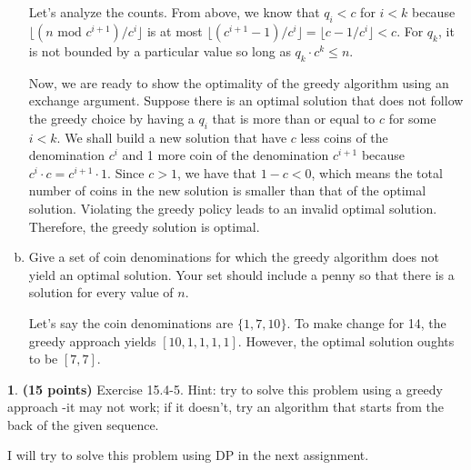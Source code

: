 \documentclass[11pt]{article}
\theoremstyle{definition}
\theoremstyle{theorem}
\newtheorem{prob}{}
\newcommand{\solution}{\medskip\noindent{\color{DarkBlue}\textbf{Solution:}}}
\begin{document}
\begin{enumerate}[(a)]
Let's analyze the counts. From above, we know that $q_i < c$ for $i < k$ because $\lfloor (n \text{ mod } c^{i+1})/c^i \rfloor$ is at most $\lfloor (c^{i+1} - 1)/c^i \rfloor = \lfloor c - 1/c^i \rfloor < c$. For $q_k$, it is not bounded by a particular value so long as $q_k \cdot c^k \le n$. 

Now, we are ready to show the optimality of the greedy algorithm using an exchange argument. Suppose there is an optimal solution that does not follow the greedy choice by having a $q_i$ that is more than or equal to $c$ for some $i < k$. We shall build a new solution that have $c$ less coins of the denomination $c^i$ and 1 more coin of the denomination $c^{i+1}$ because $c^i \cdot c = c^{i+1} \cdot 1$. Since $c > 1$, we have that $1 - c < 0$, which means the total number of coins in the new solution is smaller than that of the optimal solution. Violating the greedy policy leads to an invalid optimal solution. Therefore, the greedy solution is optimal.

\item Give a set of coin denominations for which the greedy algorithm does not yield an optimal solution. Your set should include a penny so that there is a solution for every value of $n$.

\solution

Let's say the coin denominations are $\{1, 7, 10\}$. To make change for 14, the greedy approach yields $[10, 1, 1, 1, 1]$. However, the optimal solution oughts to be $[7, 7]$.
\end{enumerate}


\newpage
\begin{prob} \textbf{(15 points)} Exercise 15.4-5. Hint: try to solve this problem using a greedy approach -it may not work; if it doesn't, try an algorithm that starts from the back of the given sequence.
\end{prob}
\solution

I will try to solve this problem using DP in the next assignment.
\end{document}
